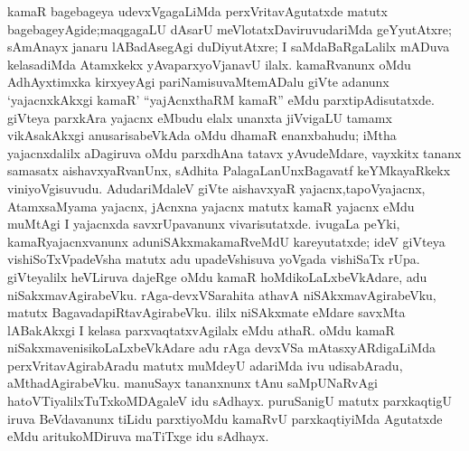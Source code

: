 kamaR bagebageya udevxVgagaLiMda perxVritavAgutatxde matutx bagebageyAgide;\break maqgagaLU dAsarU meVlotatxDaviruvudariMda geYyutAtxre; sAmAnayx janaru lABa\-dAsegAgi duDiyutAtxre; I saMdaBaRgaLalilx mADuva kelasadiMda Atamxkekx yAva\break parxyoVjanavU ilalx. kamaRvanunx oMdu AdhAyxtimxka kirxyeyAgi pariNamisuvaMte\break mADalu giVte adanunx `yajacnxkAkxgi kamaR' ``yajAcnxthaRM kamaR'' eMdu parxtipAdi\-sutatxde. giVteya parxkAra yajacnx eMbudu elalx unanxta jiVvigaLU tamamx vikAsakAkxgi anusarisabeVkAda oMdu dhamaR enanxbahudu; iMtha yajacnxdalilx aDagiruva oMdu parxdhAna tatavx yAvudeMdare, vayxkitx tananx samasatx aishavxyaRvanUnx, sAdhita PalagaLanUnx\break Bagavatf keYMkayaRkekx viniyoVgisuvudu. AdudariMdaleV giVte aishavxyaR yajacnx,\break tapoVyajacnx, AtamxsaMyama yajacnx, jAcnxna yajacnx matutx kamaR yajacnx eMdu \hbox{muMtAgi} I yajacnxda savxrUpavanunx vivarisutatxde. ivugaLa peYki, kamaRyajacnxvanunx adu\break niSAkxmakamaRveMdU kareyutatxde; ideV giVteya vishiSoTxVpadeVsha matutx adu upa\-deVshisuva yoVgada vishiSaTx rUpa. giVteyalilx heVLiruva dajeRge oMdu kamaR hoMdikoLaLxbeVkAdare, adu niSakxmavAgirabeVku. rAga-devxVSarahita athavA niSAkxma\-vAgirabeVku, matutx BagavadapiRtavAgirabeVku. ililx niSAkxmate eMdare savxMta lABakAkxgi I kelasa parxvaqtatxvAgilalx eMdu athaR. oMdu kamaR niSakxmavenisikoLaLxbeVkAdare adu rAga devxVSa mAtasxyARdigaLiMda perxVritavAgirabAradu matutx muMdeyU adariMda ivu udisabAradu, aMthadAgirabeVku. manuSayx tananxnunx tAnu saMpUNaRvAgi hatoVTiyalilxTuTxkoMDAgaleV idu sAdhayx. puruSanigU matutx parxkaqtigU iruva BeVdavanunx tiLidu parxtiyoMdu kamaRvU parxkaqtiyiMda Agutatxde eMdu aritukoMDiruva maTiTxge idu sAdhayx.


